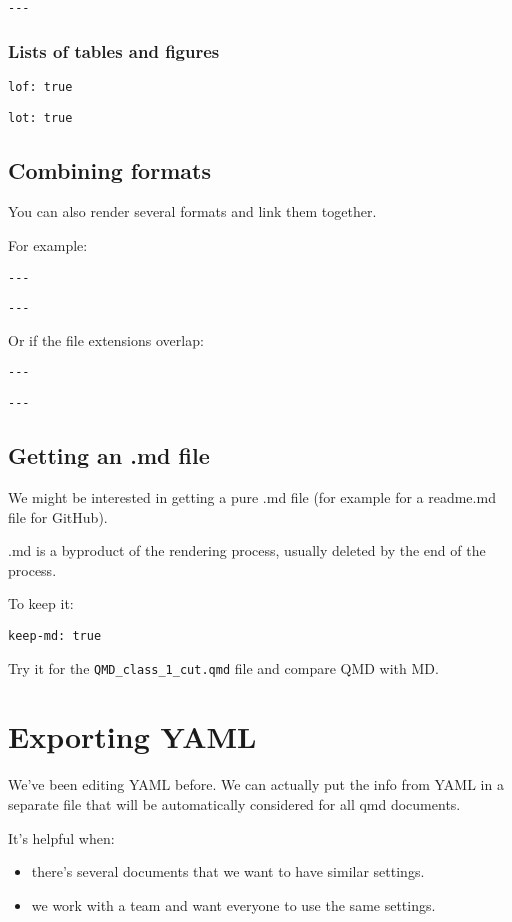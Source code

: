 \documentclass[
  letterpaper,
  DIV=11,
  numbers=noendperiod]{scrartcl}
\providecommand{\tightlist}{%
  \setlength{\itemsep}{0pt}\setlength{\parskip}{0pt}}\usepackage{longtable,booktabs,array}
\begin{document}
\texttt{-\/-\/-}

\hypertarget{lists-of-tables-and-figures}{%
\subsubsection{Lists of tables and
figures}\label{lists-of-tables-and-figures}}

\texttt{lof:\ true}

\texttt{lot:\ true}

\hypertarget{combining-formats}{%
\subsection{Combining formats}\label{combining-formats}}

You can also render several formats and link them together.

For example:

\texttt{-\/-\/-}

\texttt{-\/-\/-}

Or if the file extensions overlap:

\texttt{-\/-\/-}

\texttt{-\/-\/-}

\hypertarget{getting-an-.md-file}{%
\subsection{Getting an .md file}\label{getting-an-.md-file}}

We might be interested in getting a pure .md file (for example for a
readme.md file for GitHub).

.md is a byproduct of the rendering process, usually deleted by the end
of the process.

To keep it:

\texttt{keep-md:\ true}

Try it for the \texttt{QMD\_class\_1\_cut.qmd} file and compare QMD with
MD.

\hypertarget{exporting-yaml}{%
\section{Exporting YAML}\label{exporting-yaml}}

We've been editing YAML before. We can actually put the info from YAML
in a separate file that will be automatically considered for all qmd
documents.

It's helpful when:

\begin{itemize}
\tightlist
\item
  there's several documents that we want to have similar settings.
\item
  we work with a team and want everyone to use the same settings.
\end{itemize}
\end{document}
